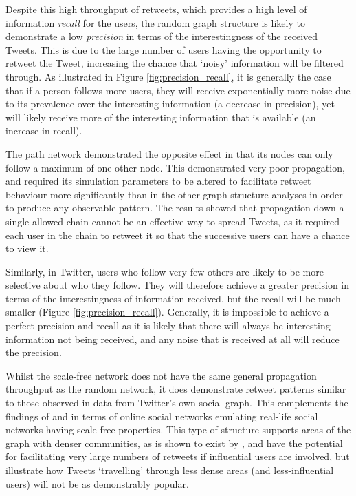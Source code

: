 Despite this high throughput of retweets, which provides a high level of information \textit{recall} for the users, the random graph structure is likely to demonstrate a low \textit{precision} in terms of the interestingness of the received Tweets. This is due to the large number of users having the opportunity to retweet the Tweet, increasing the chance that `noisy' information will be filtered through. As illustrated in Figure \ref{fig:precision_recall}, it is generally the case that if a person follows more users, they will receive exponentially more noise due to its prevalence over the interesting information (a decrease in precision), yet will likely receive more of the interesting information that is available (an increase in recall).

The path network demonstrated the opposite effect in that its nodes can only follow a maximum of one other node. This demonstrated very poor propagation, and required its simulation parameters to be altered to facilitate retweet behaviour more significantly than in the other graph structure analyses in order to produce any observable pattern. The results showed that propagation down a single allowed chain cannot be an effective way to spread Tweets, as it required each user in the chain to retweet it so that the successive users can have a chance to view it.

Similarly, in Twitter, users who follow very few others are likely to be more selective about who they follow. They will therefore achieve a greater precision in terms of the interestingness of information received, but the recall will be much smaller (Figure \ref{fig:precision_recall}). Generally, it is impossible to achieve a perfect precision and recall as it is likely that there will always be interesting information not being received, and any noise that is received at all will reduce the precision.

Whilst the scale-free network does not have the same general propagation throughput as the random network, it does demonstrate retweet patterns similar to those observed in data from Twitter's own social graph. This complements the findings of \citet{mislove07} and \citet{hein06} in terms of online social networks emulating real-life social networks having scale-free properties. This type of structure supports areas of the graph with denser communities, as is shown to exist by \citet{java07}, and have the potential for facilitating very large numbers of retweets if influential users are involved, but illustrate how Tweets `travelling' through less dense areas (and less-influential users) will not be as demonstrably popular.



